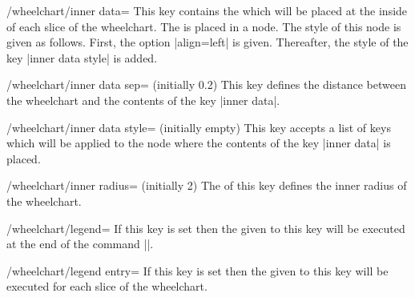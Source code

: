 \documentclass[a4paper,english,dvipsnames]{ltxdoc}
\begin{document}
\begin{key}{/wheelchart/inner data=}
This key contains the  which will be placed at the inside of each slice of the wheelchart. The  is placed in a node. The style of this node is given as follows. First, the option |align=left| is given. Thereafter, the style of the key |inner data style| is added.
\end{key}
\begin{key}{/wheelchart/inner data sep= (initially 0.2)}
This key defines the distance between the wheelchart and the contents of the key |inner data|.
\end{key}
\begin{stylekey}{/wheelchart/inner data style= (initially \normalfont empty)}
This key accepts a list of keys which will be applied to the node where the contents of the key |inner data| is placed.
\end{stylekey}
\begin{key}{/wheelchart/inner radius= (initially 2)}
The  of this key defines the inner radius of the wheelchart.
\end{key}
\begin{key}{/wheelchart/legend=}
If this key is set then the  given to this key will be executed at the end of the command |\wheelchart|.
\end{key}
\begin{key}{/wheelchart/legend entry=}
If this key is set then the  given to this key will be executed for each slice of the wheelchart.
\begin{codeexample}[width=10cm,preamble={\usepackage{etoolbox}}]
\end{codeexample}
\end{key}
\end{document}
